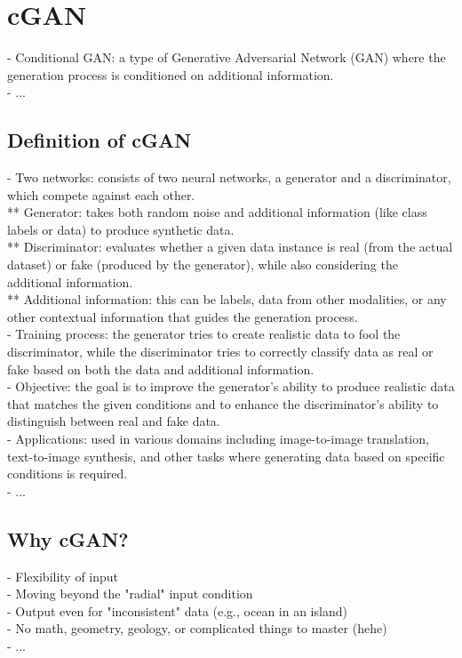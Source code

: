 \section{cGAN}
\label{sec:coral-island_cGAN}
- Conditional GAN: a type of Generative Adversarial Network (GAN) where the generation process is conditioned on additional information. \\
- ...

\subsection{Definition of cGAN}
- Two networks: consists of two neural networks, a generator and a discriminator, which compete against each other. \\
** Generator: takes both random noise and additional information (like class labels or data) to produce synthetic data. \\
** Discriminator: evaluates whether a given data instance is real (from the actual dataset) or fake (produced by the generator), while also considering the additional information. \\
** Additional information: this can be labels, data from other modalities, or any other contextual information that guides the generation process. \\
- Training process: the generator tries to create realistic data to fool the discriminator, while the discriminator tries to correctly classify data as real or fake based on both the data and additional information. \\
- Objective: the goal is to improve the generator's ability to produce realistic data that matches the given conditions and to enhance the discriminator's ability to distinguish between real and fake data. \\
- Applications: used in various domains including image-to-image translation, text-to-image synthesis, and other tasks where generating data based on specific conditions is required. \\
- ...

\subsection{Why cGAN?}
- Flexibility of input \\
- Moving beyond the "radial" input condition \\
- Output even for "inconsistent" data (e.g., ocean in an island) \\
- No math, geometry, geology, or complicated things to master (hehe) \\
- ... 

